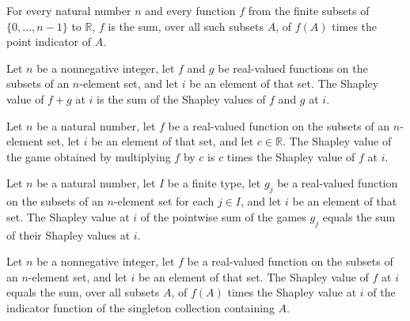 \begin{theorem}
\label{FABL.subsetPointIndicator_decomposition}
\leanok
{}
For every natural number $n$ and every function $f$ from the finite subsets of
$\{0,\ldots,n-1\}$ to $\mathbb{R}$, $f$ is the sum, over all such subsets $A$, of $f(A)$
times the point indicator of $A$.
\end{theorem}

\begin{theorem}
\label{FABL.shapleyValue_add}
\leanok
{}
Let $n$ be a nonnegative integer, let $f$ and $g$ be real-valued functions on the
subsets of an $n$-element set, and let $i$ be an element of that set. The Shapley value
of $f+g$ at $i$ is the sum of the Shapley values of $f$ and $g$ at $i$.
\end{theorem}

\begin{theorem}
\label{FABL.shapleyValue_smul}
\leanok
{}
Let $n$ be a natural number, let $f$ be a real-valued function on the subsets of an
$n$-element set, let $i$ be an element of that set, and let $c\in\mathbb R$. The Shapley
value of the game obtained by multiplying $f$ by $c$ is $c$ times the Shapley value of
$f$ at $i$.
\end{theorem}

\begin{theorem}
\label{FABL.shapleyValue_sum}
\leanok
{}
Let $n$ be a natural number, let $I$ be a finite type, let $g_j$ be a real-valued
function on the subsets of an $n$-element set for each $j\in I$, and let $i$ be an
element of that set. The Shapley value at $i$ of the pointwise sum of the games $g_j$
equals the sum of their Shapley values at $i$.
\end{theorem}

\begin{theorem}
\label{FABL.shapleyValue_eq_sum_pointIndicators}
\leanok
{}
Let $n$ be a nonnegative integer, let $f$ be a real-valued function on the subsets of an
$n$-element set, and let $i$ be an element of that set. The Shapley value of $f$ at $i$
equals the sum, over all subsets $A$, of $f(A)$ times the Shapley value at $i$ of the
indicator function of the singleton collection containing $A$.
\end{theorem}

